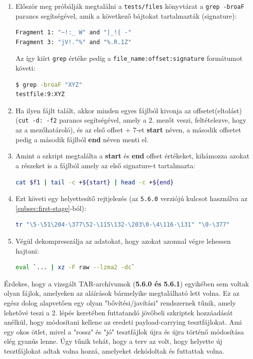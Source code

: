 \documentclass[11pt]{article}
\begin{document}
\begin{enumerate}
    \item Először meg próbálják megtalálni a \lstinline{tests/files} könyvtárat a \lstinline{grep -broaF} parancs segítségével, amik a következő bájtokat tartalmazták (signature):
    \begin{lstlisting}[language=bash]
Fragment 1: "~!:_ W" and "|_!{ -"
Fragment 3: "jV!.^%" and "%.R.1Z"
    \end{lstlisting}
    Az így kiírt \lstinline{grep} értéke pedig a \lstinline{file_name:offset:signature} formátumot követi:
    \begin{lstlisting}[language=bash]
$ grep -broaF "XYZ"
testfile:9:XYZ
    \end{lstlisting}
    
    \item Ha ilyen fájlt talált, akkor minden egyes fájlból kivonja az offsetet(eltolást) (\lstinline{cut -d: -f2} parancs segítségével, amely a 2. mezőt veszi, feltételezve, hogy az a mezőhatároló), és az első offset + 7-et \textbf{\textdollar start} néven, a második offsetet pedig a második fájlból \textbf{\textdollar end} néven menti el.

    \item Amint a szkript megtalálta a \textbf{\textdollar start} és \textbf{\textdollar end} offset értékeket, kihámozza azokat a részeket is a fájlból amely az első signature-t tartalmazta:
    \begin{lstlisting}[language=bash]
cat $f1 | tail -c +${start} | head -c +${end}
    \end{lstlisting}

    \item Ezt követi egy helyettesítő rejtjelezés (az \lstinline{5.6.0} verziójú kulcsot használva az \autoref{subsec:first-stage}-ból):
    \begin{lstlisting}[language=bash]
tr "\5-\51\204-\377\52-\115\132-\203\0-\4\116-\131" "\0-\377"
    \end{lstlisting}

    \item Végül dekompresszálja az adatokat, hogy azokat azonnal végre lehessen hajtani:
        \begin{lstlisting}[language=bash]
eval `... | xz -F raw --lzma2 -dc`
    \end{lstlisting}
    
\end{enumerate}

Érdekes, hogy a vizsgált TAR-archívumok (\textbf{5.6.0 és 5.6.1}) egyikében sem voltak olyan fájlok, amelyeken az aláírások bármelyike megtalálható lett volna. Ez az egész dolog alapvetően egy olyan "bővítési/javítási" rendszernek tűnik, amely lehetővé teszi a 2. lépés keretében futtatandó jövőbeli szkriptek hozzáadását anélkül, hogy módosítani kellene az eredeti payload-carrying tesztfájlokat. Ami egy okos ötlet, mivel a "rossz" és "jó" tesztfájlok újra és újra történő módosítása elég gyanús lenne. Úgy tűnik tehát, hogy a terv az volt, hogy helyette új tesztfájlokat adtak volna hozzá, amelyeket dekódoltak és futtattak volna.
\end{document}
